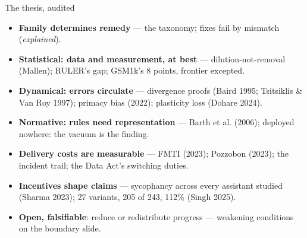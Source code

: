 \documentclass[11pt]{beamer}
\begin{document}
\begin{frame}{The thesis, audited}
  \footnotesize
  \begin{itemize}
    \item \textbf{Family determines remedy} --- the taxonomy; fixes fail
          by mismatch (\emph{explained}).
    \item \textbf{Statistical: data and measurement, at best} ---
          dilution-not-removal (Mallen); RULER's gap; GSM1k's \alert{8
          points}, frontier excepted.
    \item \textbf{Dynamical: errors circulate} --- divergence proofs (Baird
          1995; Tsitsiklis \& Van Roy 1997); primacy bias (2022); plasticity
          loss (Dohare 2024).
    \item \textbf{Normative: rules need representation} --- Barth et al.
          (2006); deployed \alert{nowhere}: the vacuum is the finding.
    \item \textbf{Delivery costs are measurable} --- FMTI (2023); Pozzobon
          (2023); the incident trail; the Data Act's switching duties.
    \item \textbf{Incentives shape claims} --- sycophancy across every
          assistant studied (Sharma 2023); \alert{27} variants,
          \alert{205 of 243}, \alert{112\%} (Singh 2025).
    \item \textbf{Open, falsifiable}: reduce or redistribute progress ---
          weakening conditions on the boundary slide.
  \end{itemize}
\end{frame}
\end{document}
